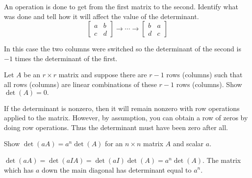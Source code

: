 \documentclass{ximera}
\begin{document}
\begin{problem}\label{prb:7.13} An operation is done to get from the first matrix to the second.
Identify what was done and tell how it will affect the value of the
determinant.
\begin{equation*}
\left[
\begin{array}{cc}
a & b \\
c & d
\end{array}
\right] \rightarrow \cdots \rightarrow \left[
\begin{array}{cc}
b & a \\
d & c
\end{array}
\right]
\end{equation*}
\begin{hint}
In this case the two columns were switched so the determinant of the second
is $-1$ times the determinant of the first.
\end{hint}
\end{problem}


\begin{problem}\label{prb:7.14} Let $A$ be an $r\times r$ matrix and suppose there are $r-1$ rows
(columns) such that all rows (columns) are linear combinations of these $r-1$
rows (columns). Show $\det \left( A\right) =0.$
\begin{hint}
If the determinant is nonzero, then it will remain nonzero with row operations applied to the matrix.
However, by assumption, you can obtain a row of zeros by doing row
operations. Thus the determinant must have been zero after all.
\end{hint}
\end{problem}

\begin{problem}\label{prb:7.15} Show $\det \left( aA\right) =a^{n}\det \left( A\right) $ for an $n \times n $ matrix $A
$ and scalar $a$.
\begin{hint}
$\det \left( aA\right) =\det
\left( aIA\right) =\det \left( aI\right) \det \left( A\right) =a^{n}\det
\left( A\right) .$ The matrix which has $a$ down the main diagonal has
determinant equal to $a^{n}$.
\end{hint}
\end{problem}
\end{document}
